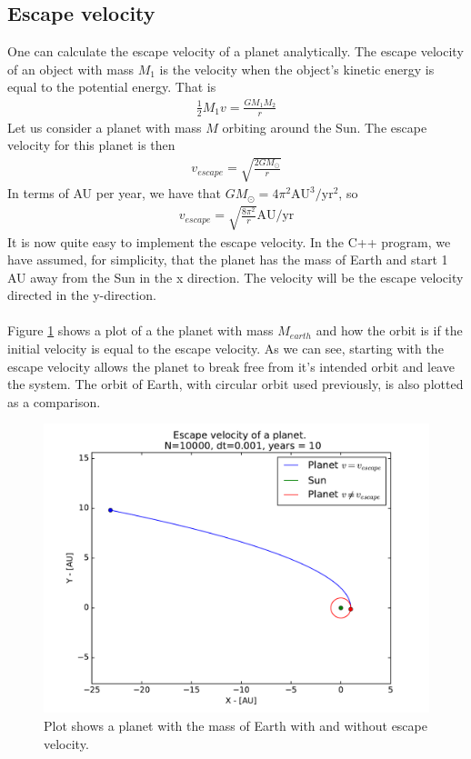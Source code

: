 \documentclass{article}
\begin{document}
\FloatBarrier
\subsection{Escape velocity}
One can calculate the escape velocity of a planet analytically. The escape velocity of an object with mass $M_1$ is the velocity when the object's kinetic energy is equal to the potential energy. That is
\begin{align*}
\frac{1}{2}M_1v = \frac{GM_1M_2}{r}
\end{align*}
Let us consider a planet with mass $M$ orbiting around the Sun. The escape velocity for this planet is then
\begin{align*}
v_{escape} = \sqrt{\frac{2GM_{\odot}}{r}}
\end{align*}
In terms of AU per year, we have that $GM_{\odot} = 4\pi^2 \text{AU}^3/\text{yr}^2$, so
\begin{align*}
v_{escape} = \sqrt{\frac{8\pi^2}{r}} \text{AU}/\text{yr}
\end{align*}
It is now quite easy to implement the escape velocity. In the C++ program, we have assumed, for simplicity, that the planet has the mass of Earth and start 1 AU away from the Sun in the x direction. The velocity will be the escape velocity directed in the y-direction. \\\\
Figure \ref{fig:EscapeVel} shows a plot of a the planet with mass $M_{earth}$ and how the orbit is if the initial velocity is equal to the escape velocity. As we can see, starting with the escape velocity allows the planet to break free from it's intended orbit and leave the system. The orbit of Earth, with circular orbit used previously, is also plotted as a comparison. \\
\begin{figure}[!h]
\centering
\includegraphics[width=\linewidth]{Plots/Escape_velocity.pdf}
\caption{Plot shows a planet with the mass of Earth with and without escape velocity.}
\label{fig:EscapeVel}
\end{figure}
\end{document}
